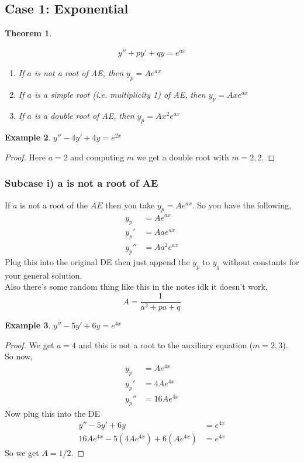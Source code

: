 \documentclass[oneside,11pt,pdftex,final]{book}%
\numberwithin{equation}{section}
\newtheorem{theorem}{Theorem}[chapter]%
\newtheorem{example}[theorem]{Example}
\numberwithin{section}{chapter}
\numberwithin{equation}{chapter}
\begin{document}
\subsection{Case 1: Exponential}
\begin{theorem}\label{th:udcexp}


\begin{align}
	y''+py'+qy=e^{ax} \label{eq:udcexp}
\end{align}
\begin{enumerate}
	\item If $ a $ is not a root of AE, then $ y_p =Ae^{ax}$
	\item If $ a $ is a simple root (i.e. multiplicity 1) of AE, then $ y_p=Ax e^{ax} $
	\item If $ a $ is a double root of AE, then $ y_p=A x^2 e^{ax} $
\end{enumerate}
\end{theorem}
\begin{example}
	$ y''-4y'+4y=e^{2x} $
\end{example}
\begin{proof}
	Here $ a=2 $ and computing $ m $ we get a double root with $ m=2,2 $.
\end{proof}

\subsubsection{Subcase i) a is not a root of AE}
If $ a $ is not a root of the $ AE $ then you take $ y_p=Ae^{ax}$. So you have the following,
\begin{align*}
	y_p&=Ae^{ax}\\
	y_p'&=Aae^{ax}\\
	y_p''&=Aa^2e^{ax}
\end{align*}
Plug this into the original DE then just append the $ y_p $ to $ y_g $ without constants for your general solution.\\

Also there's some random thing like this in the notes idk it doesn't work, \[ A=\frac{1}{a^2+pa+q} \]


\begin{example}
	$ y''-5y'+6y=e^{4x} $
\end{example}
\begin{proof}
	We get $ a=4 $ and this is not a root to the auxiliary equation ($ m=2,3 $).\\
	So now,
	\begin{align*}
		 y_p&=Ae^{4x}\\
		 y_p'&=4Ae^{4x}\\
		 y_p''&=16Ae^{4x}
	\end{align*}
Now plug this into the DE
\begin{align*}
	y''-5y'+6y&=e^{4x}\\
	16Ae^{4x}-5(4Ae^{4x})+6(Ae^{4x})&=e^{4x}
\end{align*}
So we get $ A=1/2 $.
\end{proof}
\end{document}

